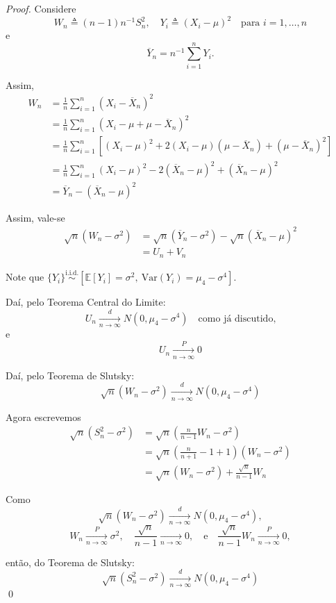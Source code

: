 \documentclass[12pt,a4paper]{article}
\theoremstyle{plain}
\theoremstyle{definition}
\theoremstyle{remark}
\begin{document}
\begin{proof}
Considere 
\[
W_n \triangleq (n-1) n^{-1} S_n^2, \quad Y_i \triangleq (X_i - \mu)^2 \quad \text{para } i = 1, \ldots, n
\]
e 
\[
\overline{Y}_n = n^{-1} \sum_{i=1}^n Y_i.
\]

Assim,
\begin{align}
W_n &= \frac{1}{n} \sum_{i=1}^n (X_i - \overline{X}_n)^2 \\
&= \frac{1}{n} \sum_{i=1}^n \left( X_i - \mu + \mu - \overline{X}_n \right)^2 \\
&= \frac{1}{n} \sum_{i=1}^n \left[ (X_i - \mu)^2 + 2(X_i - \mu)(\mu - \overline{X}_n) + (\mu - \overline{X}_n)^2 \right] \\
&= \frac{1}{n} \sum_{i=1}^n (X_i - \mu)^2 - 2(\overline{X}_n - \mu)^2 + (\overline{X}_n - \mu)^2 \\
&= \overline{Y}_n - (\overline{X}_n - \mu)^2
\end{align}

Assim, vale-se
\begin{align}
\sqrt{n} \left( W_n - \sigma^2 \right) &= \sqrt{n} \left( \overline{Y}_n - \sigma^2 \right) - \sqrt{n} \left( \overline{X}_n - \mu \right)^2 \\
&= U_n + V_n
\end{align}

Note que $\{ Y_i \} \stackrel{\text{i.i.d.}}{\sim} \left[ \mathbb{E}[Y_i] = \sigma^2, \ \mathrm{Var}(Y_i) = \mu_4 - \sigma^4 \right]$.

Daí, pelo Teorema Central do Limite:
\[
U_n \xrightarrow[n \to \infty]{d} N(0, \mu_4 - \sigma^4) \quad \text{como já discutido,}
\]
e
\[
U_n \xrightarrow[n \to \infty]{P} 0
\]

Daí, pelo Teorema de Slutsky:
\[
\sqrt{n} \left( W_n - \sigma^2 \right) \xrightarrow[n \to \infty]{d} N(0, \mu_4 - \sigma^4)
\]

Agora escrevemos
\begin{align}
\sqrt{n} \left( S_n^2 - \sigma^2 \right) &= \sqrt{n} \left( \frac{n}{n-1} W_n - \sigma^2 \right) \\
&= \sqrt{n} \left( \frac{n}{n+1} - 1 + 1 \right) \left( W_n - \sigma^2 \right) \\
&= \sqrt{n} \left( W_n - \sigma^2 \right) + \frac{\sqrt{n}}{n-1} W_n
\end{align}

Como 
\[
\sqrt{n} \left( W_n - \sigma^2 \right) \xrightarrow[n \to \infty]{d} N(0, \mu_4 - \sigma^4),
\]
\[
W_n \xrightarrow[n \to \infty]{P} \sigma^2, \quad \frac{\sqrt{n}}{n-1} \xrightarrow[n \to \infty]{} 0, \quad \text{e} \quad \frac{\sqrt{n}}{n-1} W_n \xrightarrow[n \to \infty]{P} 0,
\]

então, do Teorema de Slutsky:
\[
\sqrt{n} \left( S_n^2 - \sigma^2 \right) \xrightarrow[n \to \infty]{d} N(0, \mu_4 - \sigma^4)
\]
\qed
\end{proof}
\end{document}
